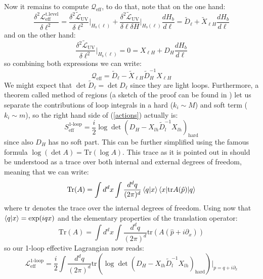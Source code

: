 \documentclass[11pt]{article}
\begin{document}
Now it remains to compute $\mathcal{Q}_{\text{eff}}$, to do that, note that on the one hand:
\begin{equation}
    \dfrac{\delta^2\mathcal{L}_{\text{eff}}^{\text{t.level}}}{\delta\ell^2}=\dfrac{\delta^2\tilde{\mathcal{L}}_{\text{UV}}}{\delta\ell^2}\Bigg|_{H_b(\ell)}+\dfrac{\delta^2\tilde{\mathcal{L}}_{\text{UV}}}{\delta\ell\delta H}\Bigg|_{H_b(\ell)}\dfrac{dH_b}{d \ell}=\tilde{D}_{\ell}+\tilde{X}_{\ell H}\dfrac{dH_b}{d \ell}
\end{equation}
and on the other hand:
\begin{equation}
    \dfrac{\delta^2\tilde{\mathcal{L}}_{\text{UV}}}{\delta\ell^2}\Bigg|_{H_b(\ell)}=0=X_{\ell H}+D_H\dfrac{dH_b}{d \ell}
\end{equation}
so combining both expressions we can write:
\begin{equation}
    \mathcal{Q}_{\text{eff}}=\tilde{D}_\ell-\tilde{X}_{\ell H}\tilde{D}_H^{-1}X_{\ell H}
\end{equation}
We might expect that $\det\tilde{D}_\ell=\det D_\ell$ since they are light loops. Furthermore, a theorem called method of regions (a sketch of the proof can be found in \cite{Falkowski}) let us separate the contributions of loop integrals in a hard ($k_i\sim M$) and soft term ($k_i\sim m$), so the right hand side of (\ref{actions}) actually is:
\begin{equation}\label{action1loop}
    S^{\text{1-loop}}_{\text{eff}}=\dfrac{i}{2}\log\det(D_H-X_{lh}\tilde{D}^{-1}_l X_{lh} )_{\text{hard}}
\end{equation}
since also $D_H$ has no soft part. This can be further simplified using the famous formula $\log(\det A)=\text{Tr}(\log A)$. 
This trace as it is pointed out in \cite{Fuentes_Mart_n_2016} should be understood as a trace over both internal and external degrees of freedom, meaning that we can write:
\begin{equation}
    \text{Tr}(A)=\int d^dx\int\dfrac{d^dq}{(2\pi)^d}\braket{q|x}\braket{x|\text{tr}{A(\hat{p})}|q}
\end{equation}
where tr denotes the trace over the internal degrees of freedom. Using now that $\braket{q|x}=\exp(iqx)$ and the elementary properties of the translation operator:
\begin{equation}
     \text{Tr}(A)=\int d^dx\int\dfrac{d^dq}{(2\pi)^d}\text{tr}({A(\hat{p}+i\partial_x)})
\end{equation}
so our 1-loop effective Lagrangian now reads:
\begin{equation}
    \mathcal{L}^{\text{1-loop}}_{\text{eff}}=\dfrac{i}{2}\int \dfrac{d^dq}{(2\pi)^d}\text{tr}(\log\det(D_H-X_{lh}\tilde{D}^{-1}_l X_{lh} )_{\text{hard}})|_{p=q+i\partial_x}
\end{equation}
\end{document}

